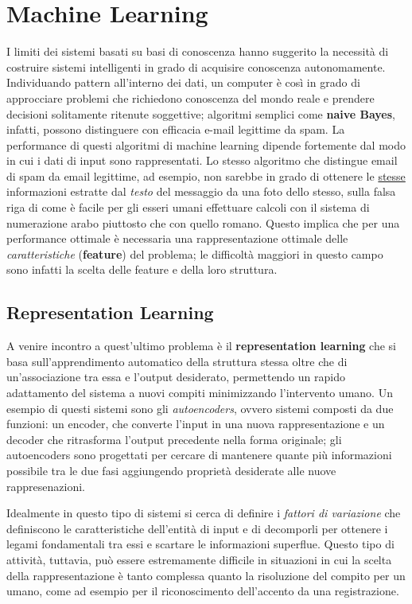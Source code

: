 \documentclass[12pt,a4paper]{report}
\begin{document}
    \section{Machine Learning} \label{mlsection}
    I limiti dei sistemi basati su basi di conoscenza hanno
    suggerito la necessit\`a di costruire sistemi intelligenti in
    grado di acquisire conoscenza autonomamente. Individuando
    pattern all'interno dei dati, un computer \`e cos\`i in grado
    di approcciare problemi che richiedono conoscenza del mondo 
    reale e prendere decisioni solitamente ritenute soggettive;
    algoritmi semplici come \textbf{naive Bayes}, infatti, possono 
    distinguere con efficacia e-mail legittime da spam. La 
    performance di questi algoritmi di machine learning dipende 
    fortemente dal modo in cui i dati di input sono rappresentati.
    Lo stesso algoritmo che distingue email di spam da email 
    legittime, ad esempio, non sarebbe in grado di ottenere le 
    \underline{stesse} informazioni estratte dal \textit{testo} del
    messaggio da una foto dello stesso, sulla falsa riga di come 
    \`e facile per gli esseri umani effettuare calcoli con il 
    sistema di numerazione arabo piuttosto che con quello romano. 
    Questo implica che per una performance ottimale \`e necessaria 
    una rappresentazione ottimale delle \textit{caratteristiche} 
    (\textbf{feature}) del problema; le difficolt\`a maggiori in 
    questo campo sono infatti la scelta delle feature e della loro
    struttura.
    
    \subsection{Representation Learning}
    A venire incontro a quest'ultimo problema \`e il 
    \textbf{representation learning} che si basa sull'apprendimento
    automatico della struttura stessa oltre che di un'associazione
    tra essa e l'output desiderato, permettendo un rapido
    adattamento del sistema a nuovi compiti minimizzando 
    l'intervento umano. Un esempio di questi sistemi sono gli
    \textit{autoencoders}, ovvero sistemi composti da due funzioni:
    un encoder, che converte l'input in una nuova rappresentazione 
    e un decoder che ritrasforma l'output precedente nella forma
    originale; gli autoencoders sono progettati per cercare di 
    mantenere quante pi\`u informazioni possibile tra le due fasi
    aggiungendo propriet\`a desiderate alle nuove rappresenazioni.
    
    \medskip
    Idealmente in questo tipo di sistemi si cerca di definire i 
    \textit{fattori di variazione} che definiscono le 
    caratteristiche dell'entit\`a di input e di decomporli per 
    ottenere i legami fondamentali tra essi e scartare le 
    informazioni superflue. Questo tipo di attivit\`a, tuttavia, 
    pu\`o essere estremamente difficile in situazioni in cui la 
    scelta della rappresentazione \`e tanto complessa quanto la 
    risoluzione del compito per un umano, come ad esempio per il 
    riconoscimento dell'accento da una registrazione.
    
\end{document}
